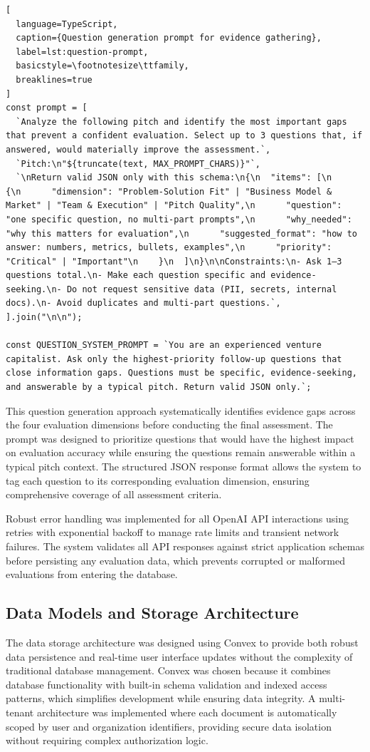 \begin{lstlisting}[
  language=TypeScript,
  caption={Question generation prompt for evidence gathering},
  label=lst:question-prompt,
  basicstyle=\footnotesize\ttfamily,
  breaklines=true
]
const prompt = [
  `Analyze the following pitch and identify the most important gaps that prevent a confident evaluation. Select up to 3 questions that, if answered, would materially improve the assessment.`,
  `Pitch:\n"${truncate(text, MAX_PROMPT_CHARS)}"`,
  `\nReturn valid JSON only with this schema:\n{\n  "items": [\n    {\n      "dimension": "Problem-Solution Fit" | "Business Model & Market" | "Team & Execution" | "Pitch Quality",\n      "question": "one specific question, no multi-part prompts",\n      "why_needed": "why this matters for evaluation",\n      "suggested_format": "how to answer: numbers, metrics, bullets, examples",\n      "priority": "Critical" | "Important"\n    }\n  ]\n}\n\nConstraints:\n- Ask 1–3 questions total.\n- Make each question specific and evidence-seeking.\n- Do not request sensitive data (PII, secrets, internal docs).\n- Avoid duplicates and multi-part questions.`,
].join("\n\n");

const QUESTION_SYSTEM_PROMPT = `You are an experienced venture capitalist. Ask only the highest-priority follow-up questions that close information gaps. Questions must be specific, evidence-seeking, and answerable by a typical pitch. Return valid JSON only.`;
\end{lstlisting}

This question generation approach systematically identifies evidence gaps across the four evaluation dimensions before conducting the final assessment. The prompt was designed to prioritize questions that would have the highest impact on evaluation accuracy while ensuring the questions remain answerable within a typical pitch context. The structured JSON response format allows the system to tag each question to its corresponding evaluation dimension, ensuring comprehensive coverage of all assessment criteria.

Robust error handling was implemented for all OpenAI API interactions using retries with exponential backoff to manage rate limits and transient network failures. The system validates all API responses against strict application schemas before persisting any evaluation data, which prevents corrupted or malformed evaluations from entering the database.

\subsection{Data Models and Storage Architecture}\label{subsec:data-models-and-storage-architecture}
The data storage architecture was designed using Convex to provide both robust data persistence and real-time user interface updates without the complexity of traditional database management. Convex was chosen because it combines database functionality with built-in schema validation and indexed access patterns, which simplifies development while ensuring data integrity. A multi-tenant architecture was implemented where each document is automatically scoped by user and organization identifiers, providing secure data isolation without requiring complex authorization logic.

